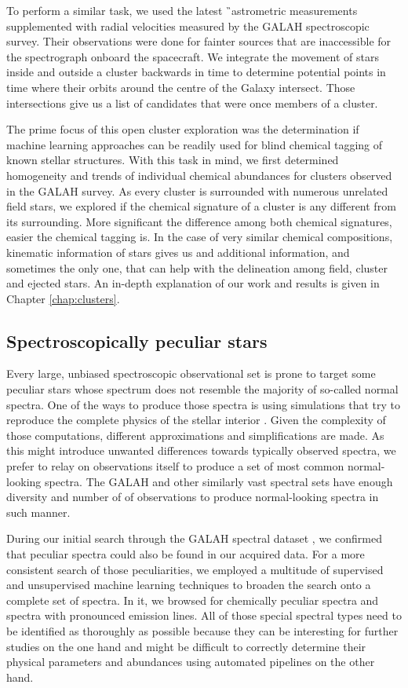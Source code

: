 To perform a similar task, we used the latest \G\ astrometric measurements supplemented with radial velocities measured by the GALAH spectroscopic survey. Their observations were done for fainter sources that are inaccessible for the spectrograph onboard the spacecraft. We integrate the movement of stars inside and outside a cluster backwards in time to determine potential points in time where their orbits around the centre of the Galaxy intersect. Those intersections give us a list of candidates that were once members of a cluster.

The prime focus of this open cluster exploration was the determination if machine learning approaches can be readily used for blind chemical tagging of known stellar structures. With this task in mind, we first determined homogeneity and trends of individual chemical abundances for clusters observed in the GALAH survey. As every cluster is surrounded with numerous unrelated field stars, we explored if the chemical signature of a cluster is any different from its surrounding. More significant the difference among both chemical signatures, easier the chemical tagging is. In the case of very similar chemical compositions, kinematic information of stars gives us and additional information, and sometimes the only one, that can help with the delineation among field, cluster and ejected stars. An in-depth explanation of our work and results is given in Chapter \ref{chap:clusters}.

\subsection{Spectroscopically peculiar stars}
Every large, unbiased spectroscopic observational set is prone to target some peculiar stars whose spectrum does not resemble the majority of so-called normal spectra. One of the ways to produce those spectra is using simulations that try to reproduce the complete physics of the stellar interior \cite{2008A&A...486..951G}. Given the complexity of those computations, different approximations and simplifications are made. As this might introduce unwanted differences towards typically observed spectra, we prefer to relay on observations itself to produce a set of most common normal-looking spectra. The GALAH and other similarly vast spectral sets have enough diversity and number of of observations to produce normal-looking spectra in such manner.

During our initial search through the GALAH spectral dataset \cite{2017ApJS..228...24T}, we confirmed that peculiar spectra could also be found in our acquired data. For a more consistent search of those peculiarities, we employed a multitude of supervised and unsupervised machine learning techniques to broaden the search onto a complete set of spectra. In it, we browsed for chemically peculiar spectra and spectra with pronounced emission lines. All of those special spectral types need to be identified as thoroughly as possible because they can be interesting for further studies on the one hand and might be difficult to correctly determine their physical parameters and abundances using automated pipelines on the other hand.

